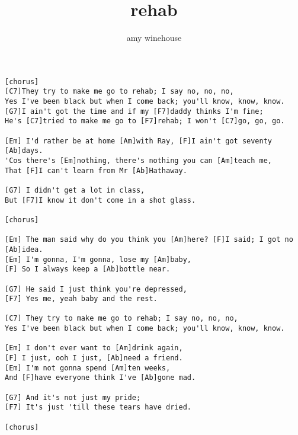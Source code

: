 \author{amy winehouse}
\title{rehab}
\maketitle
\begin{verbatim}
[chorus]
[C7]They try to make me go to rehab; I say no, no, no,
Yes I've been black but when I come back; you'll know, know, know.
[G7]I ain't got the time and if my [F7]daddy thinks I'm fine;
He's [C7]tried to make me go to [F7]rehab; I won't [C7]go, go, go.

[Em] I'd rather be at home [Am]with Ray, [F]I ain't got seventy [Ab]days.
'Cos there's [Em]nothing, there's nothing you can [Am]teach me,
That [F]I can't learn from Mr [Ab]Hathaway.

[G7] I didn't get a lot in class,
But [F7]I know it don't come in a shot glass.

[chorus]

[Em] The man said why do you think you [Am]here? [F]I said; I got no [Ab]idea.
[Em] I'm gonna, I'm gonna, lose my [Am]baby,
[F] So I always keep a [Ab]bottle near.

[G7] He said I just think you're depressed,
[F7] Yes me, yeah baby and the rest.

[C7] They try to make me go to rehab; I say no, no, no,
Yes I've been black but when I come back; you'll know, know, know.

[Em] I don't ever want to [Am]drink again,
[F] I just, ooh I just, [Ab]need a friend.
[Em] I'm not gonna spend [Am]ten weeks,
And [F]have everyone think I've [Ab]gone mad.

[G7] And it's not just my pride;
[F7] It's just 'till these tears have dried.

[chorus]
\end{verbatim}
